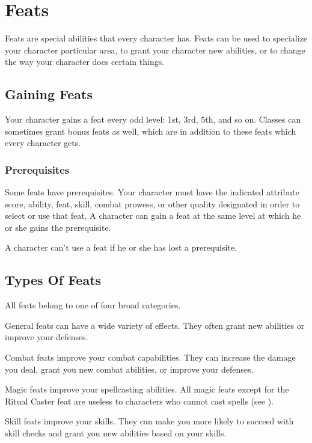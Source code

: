 \chapter{Feats}\label{Feats}

Feats are special abilities that every character has.
Feats can be used to specialize your character particular area, to grant your character new abilities, or to change the way your character does certain things.

\section{Gaining Feats}
    Your character gains a feat every odd level: 1st, 3rd, 5th, and so on.
    Classes can sometimes grant bonus feats as well, which are in addition to these feats which every character gets.

    \subsection{Prerequisites}
        Some feats have prerequisites.
        Your character must have the indicated attribute score, ability, feat, skill, combat prowess, or other quality designated in order to select or use that feat.
        A character can gain a feat at the same level at which he or she gains the prerequisite.

        A character can't use a feat if he or she has lost a prerequisite.

\section{Types Of Feats}
    All feats belong to one of four broad categories.

     General feats can have a wide variety of effects.
    They often grant new abilities or improve your defenses.

     Combat feats improve your combat capabilities.
    They can increase the damage you deal, grant you new combat abilities, or improve your defenses.

     Magic feats improve your spellcasting abilities.
    All magic feats except for the Ritual Caster feat are useless to characters who cannot cast spells (see ).

     Skill feats improve your skills.
    They can make you more likely to succeed with skill checks and grant you new abilities based on your skills.

